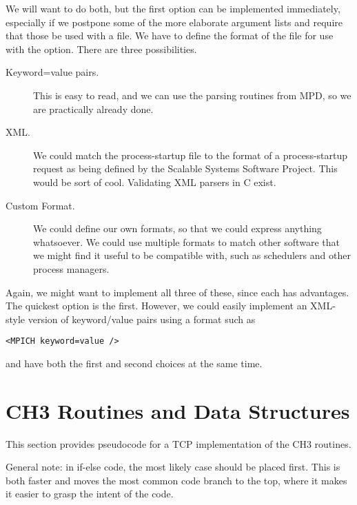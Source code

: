\documentclass{article}
\begin{document}
We will want to do both, but the first option can be implemented
immediately, especially if we postpone some of the more elaborate argument
lists and require that those be used with a file.  We have to define the
format of the file for use with the  option.  There are three
possibilities.
\begin{description}
\item[Keyword=value pairs.] This is easy to read, and we can use the
  parsing routines from MPD, so we are practically already done.
\item[XML.] We could match the process-startup file to the format of a
  process-startup request as being defined by the Scalable Systems Software
  Project.  This would be sort of cool.  Validating XML parsers in C exist.
\item[Custom Format.] We could define our own formats, so that we could express
  anything whatsoever.  We could use multiple formats to match other software
  that we might find it useful to be compatible with, such as schedulers and
  other process managers.
\end{description}

Again, we might want to implement all three of these, since each has
advantages.  The quickest option is the first.  However, we could easily
implement an XML-style version of keyword/value pairs using a format such as
\begin{verbatim}
<MPICH keyword=value />
\end{verbatim}
and have both the first and second choices at the same time.


\appendix
\section{CH3 Routines and Data Structures}
\label{app:ch3}

This section provides pseudocode for a TCP implementation of the CH3
routines.

General note: in if-else code, the most likely case should be placed first.
This is both faster and moves the most common code branch to the top, where it
makes it easier to grasp the intent of the code.
\end{document}
